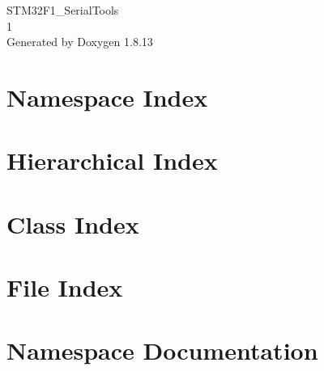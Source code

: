 \documentclass[twoside]{book}
\newcommand{\+}{\discretionary{\mbox{\scriptsize$\hookleftarrow$}}{}{}}
\newcommand{\clearemptydoublepage}{%
  \newpage{\pagestyle{empty}\cleardoublepage}%
}
\begin{document}
\hypersetup{pageanchor=false,
             bookmarksnumbered=true,
             pdfencoding=unicode
            }
\begin{titlepage}
\vspace*{7cm}
\begin{center}%
{\Large S\+T\+M32\+F1\+\_\+\+Serial\+Tools \\[1ex]\large 1 }\\
\vspace*{1cm}
{\large Generated by Doxygen 1.8.13}\\
\end{center}
\end{titlepage}
\clearemptydoublepage
{}
\tableofcontents
\clearemptydoublepage
{}
\hypersetup{pageanchor=true}

\chapter{Namespace Index}

\chapter{Hierarchical Index}

\chapter{Class Index}

\chapter{File Index}

\chapter{Namespace Documentation}













\end{document}
